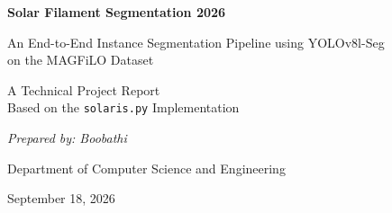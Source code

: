 \documentclass[11pt,a4paper,openany]{report}
\begin{document}
\begin{titlepage}
\centering
\vspace*{2cm}
{\Huge\bfseries Solar Filament Segmentation 2026\par}
\vspace{0.5cm}
{\Large An End-to-End Instance Segmentation Pipeline using YOLOv8l-Seg\\
on the MAGFiLO Dataset\par}
\vspace{1.5cm}
{\large A Technical Project Report\\
Based on the \texttt{solaris.py} Implementation\par}
\vspace{1.5cm}
{\large\itshape Prepared by: Boobathi\par}
\vspace{0.3cm}
{\large Department of Computer Science and Engineering\par}
\vspace{0.3cm}
{\large September 18, 2026\par}
\vspace{2cm}
\begin{abstract}
\noindent
Solar filaments are elongated, dark, thread-like structures observed in H-alpha images of the
Sun's chromosphere. Automated detection and segmentation of filaments is important for
space-weather monitoring, since filament eruptions are closely linked to Coronal Mass Ejections
(CMEs) that can affect satellites, power grids, and communication systems on Earth.


\end{abstract}
\end{titlepage}
\end{document}
